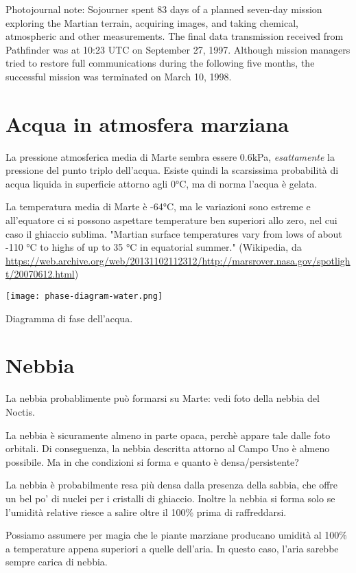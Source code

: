 \documentclass[a4paper,10pt,openany,oneside]{memoir}
\begin{document}
Photojournal note: Sojourner spent 83 days of a planned seven-day mission exploring the Martian terrain, acquiring images, and taking chemical, atmospheric and other measurements. The final data transmission received from Pathfinder was at 10:23 UTC on September 27, 1997. Although mission managers tried to restore full communications during the following five months, the successful mission was terminated on March 10, 1998. 





\section{Acqua in atmosfera marziana}

La pressione atmosferica media di Marte sembra essere 0.6kPa, \emph{esattamente} la pressione del punto triplo dell'acqua. Esiste quindi la scarsissima probabilità di acqua liquida in superficie attorno agli 0°C, ma di norma l'acqua è gelata.

La temperatura media di Marte è -64°C, ma le variazioni sono estreme e all'equatore ci si possono aspettare temperature ben superiori allo zero, nel cui caso il ghiaccio sublima. "Martian surface temperatures vary from lows of about -110 °C to highs of up to 35 °C in equatorial summer." (Wikipedia, da \url{https://web.archive.org/web/20131102112312/http://marsrover.nasa.gov/spotlight/20070612.html})

\texttt{[image: phase-diagram-water.png]}

Diagramma di fase dell'acqua.

\section{Nebbia}

La nebbia probablimente può formarsi su Marte: vedi foto della nebbia del Noctis. 

La nebbia è sicuramente almeno in parte opaca, perchè appare tale dalle foto orbitali. Di conseguenza, la nebbia descritta attorno al Campo Uno è almeno possibile. Ma in che condizioni si forma e quanto è densa/persistente?

La nebbia è probabilmente resa più densa dalla presenza della sabbia, che offre un bel po' di nuclei per i cristalli di ghiaccio. Inoltre la nebbia si forma solo se l'umidità relative riesce a salire oltre il 100\% prima di raffreddarsi.

Possiamo assumere per magia che le piante marziane producano umidità al 100\% a temperature appena superiori a quelle dell'aria. In questo caso, l'aria sarebbe sempre carica di nebbia.
\end{document}
